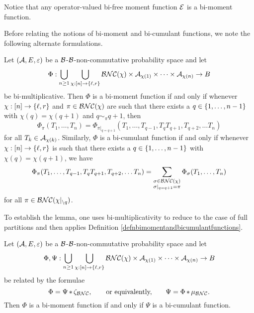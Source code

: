 		Notice that any operator-valued bi-free moment function $\mathcal{E}$ is a bi-moment function.

		Before relating the notions of bi-moment and bi-cumulant functions, we note the following alternate formulations.
		\begin{lemma}
			\label{lemequivalentnotionsofbimomentandbicumulant}
			Let $(\mathcal{A}, E, \varepsilon)$ be a $\mathcal{B}$-$\mathcal{B}$-non-commutative probability space and let
			\[
				\Phi : \bigcup_{n\geq 1} \bigcup_{\chi : [n] \to \left\{\ell, r\right\}} \mathcal{BNC}(\chi) \times \mathcal{A}_{\chi(1)} \times \cdots \times \mathcal{A}_{\chi(n)} \to B
			\]
			be bi-multiplicative.
			Then $\Phi$ is a bi-moment function if and only if whenever $\chi : [n] \to \left\{\ell, r\right\}$ and $\pi \in \mathcal{BNC}(\chi)$ are such that there exists a $q \in \left\{1,\ldots, n-1\right\}$ with $\chi(q) = \chi(q+1)$ and $q \sim_\pi q+1$, then
			\[
				\Phi_\pi(T_1, \ldots, T_n) = \Phi_{\pi|_{q = q+1}}(T_1, \ldots, T_{q-1}, T_qT_{q+1}, T_{q+2}, \ldots T_n)
			\]
			for all $T_k \in \mathcal{A}_{\chi(k)}$.
			Similarly, $\Phi$ is a bi-cumulant function if and only if whenever $\chi : [n] \to \left\{\ell, r\right\}$ is such that there exists a $q \in \left\{1,\ldots, n-1\right\}$ with $\chi(q) = \chi(q+1)$, we have
			\[
				\Phi_{\pi}(T_1, \ldots, T_{q-1}, T_qT_{q+1}, T_{q+2}, \ldots T_n) = \sum_{\substack{\sigma \in \mathcal{BNC}(\chi) \\ \sigma|_{q = q+1} = \pi}} \Phi_\sigma(T_1, \ldots, T_n)
			\]
			for all $\pi \in \mathcal{BNC}(\chi|_{\setminus q})$.
		\end{lemma}

		To establish the lemma, one uses bi-multiplicativity to reduce to the case of full partitions and then applies Definition \ref{defnbimomentandbicumulantfunctions}.


		\begin{theorem}
			\label{thmrelationbetweenbimomentandbicumulantfunctions}
			Let $(\mathcal{A}, E, \varepsilon)$ be a $\mathcal{B}$-$\mathcal{B}$-non-commutative probability space and let
			\[
				\Phi , \Psi: \bigcup_{n\geq 1} \bigcup_{\chi : [n] \to \left\{\ell, r\right\}} \mathcal{BNC}(\chi) \times \mathcal{A}_{\chi(1)} \times \cdots \times \mathcal{A}_{\chi(n)} \to B
			\]
			be related by the formulae
			\[
				\Phi = \Psi \mathop{\ast} \zeta_{\mathcal{BNC}}, \qquad \text{or equivalently,} \qquad \Psi = \Phi \mathop{\ast} \mu_{\mathcal{BNC}}.
			\]
			Then $\Phi$ is a bi-moment function if and only if $\Psi$ is a bi-cumulant function. 
		\end{theorem}

